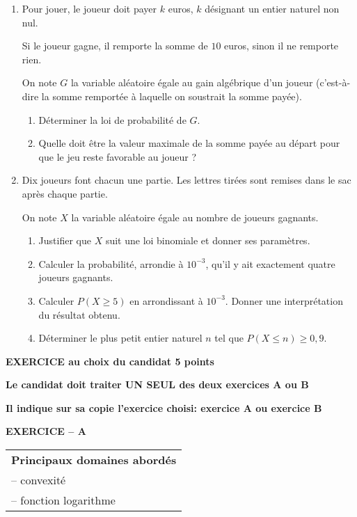 \documentclass[11pt]{article}
\begin{document}
\begin{enumerate}[resume]
\item Pour jouer, le joueur doit payer $k$ euros, $k$ désignant un entier naturel non nul. 

Si le joueur gagne, il remporte la somme de $10$ euros, sinon il ne remporte rien.

On note $G$ la variable aléatoire égale au gain algébrique d'un joueur (c'est-à-dire la somme remportée à laquelle on soustrait la somme payée).
	\begin{enumerate}
		\item Déterminer la loi de probabilité de $G$.
		\item Quelle doit être la valeur maximale de la somme payée au départ pour que le jeu reste
favorable au joueur ?	
	\end{enumerate}
\item Dix joueurs font chacun une partie. Les lettres tirées sont remises dans le sac après chaque partie.

On note $X$ la variable aléatoire égale au nombre de joueurs gagnants.
	\begin{enumerate}
		\item Justifier que $X$ suit une loi binomiale et donner ses paramètres.
		\item Calculer la probabilité, arrondie à $10^{-3}$, qu'il y ait exactement quatre joueurs gagnants. 
		\item Calculer $P(X \geqslant 5)$ en arrondissant à $10^{-3}$. Donner une interprétation du résultat obtenu. 
		\item Déterminer le plus petit entier naturel $n$ tel que $P(X \leqslant n) \geqslant 0,9$.
	\end{enumerate}
\end{enumerate}

\bigskip

\begin{center}\textbf{EXERCICE au choix du candidat \hfill 5 points}\end{center}

\medskip

\textbf{Le candidat doit traiter UN SEUL des deux exercices A ou B}

\textbf{Il indique sur sa copie l'exercice choisi: exercice A ou exercice B}

\medskip

\textbf{EXERCICE -- A}

\medskip

\begin{tabular}{|l|}\hline
\textbf{Principaux domaines abordés}\\
-- convexité\\
-- fonction logarithme\\ \hline
\end{tabular}
\end{document}
